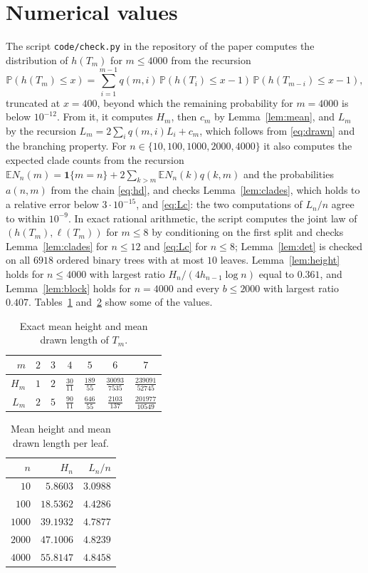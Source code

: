 \documentclass[11pt]{amsart}
\theoremstyle{remark}
\numberwithin{equation}{section}
\newcommand{\E}{\mathbb E}
\newcommand{\Pp}{\mathbb P}
\begin{document}
\section{Numerical values}\label{sec:numerics}

The script \texttt{code/check.py} in the repository of the paper computes the distribution of $h(T_m)$ for $m\le4000$ from the recursion
\[
 \Pp(h(T_m)\le x)=\sum_{i=1}^{m-1}q(m,i)\,\Pp(h(T_i)\le x-1)\,\Pp(h(T_{m-i})\le x-1),
\]
truncated at $x=400$, beyond which the remaining probability for $m=4000$ is below $10^{-12}$. From it, it computes $H_m$, then $c_m$ by Lemma~\ref{lem:mean}, and $L_m$ by the recursion $L_m=2\sum_iq(m,i)L_i+c_m$, which follows from \eqref{eq:drawn} and the branching property. For $n\in\{10,100,1000,2000,4000\}$ it also computes the expected clade counts from the recursion $\E N_n(m)=\mathbf 1\{m=n\}+2\sum_{k>m}\E N_n(k)q(k,m)$ and the probabilities $a(n,m)$ from the chain \eqref{eq:hd}, and checks Lemma~\ref{lem:clades}, which holds to a relative error below $3\cdot10^{-15}$, and \eqref{eq:Lc}: the two computations of $L_n/n$ agree to within $10^{-9}$. In exact rational arithmetic, the script computes the joint law of $(h(T_m),\ell(T_m))$ for $m\le8$ by conditioning on the first split and checks Lemma~\ref{lem:clades} for $n\le12$ and \eqref{eq:Lc} for $n\le8$; Lemma~\ref{lem:det} is checked on all $6918$ ordered binary trees with at most $10$ leaves. Lemma~\ref{lem:height} holds for $n\le4000$ with largest ratio $H_n/(4h_{n-1}\log n)$ equal to $0.361$, and Lemma~\ref{lem:block} holds for $n=4000$ and every $b\le2000$ with largest ratio $0.407$. Tables~\ref{tab:exact} and~\ref{tab:float} show some of the values.

\begin{table}[ht]
\centering
\begin{tabular}{rcccccc}
\toprule
$m$ & $2$ & $3$ & $4$ & $5$ & $6$ & $7$\\
\midrule
$H_m$ & $1$ & $2$ & $\tfrac{30}{11}$ & $\tfrac{189}{55}$ & $\tfrac{30093}{7535}$ & $\tfrac{239091}{52745}$\\[2pt]
$L_m$ & $2$ & $5$ & $\tfrac{90}{11}$ & $\tfrac{646}{55}$ & $\tfrac{2103}{137}$ & $\tfrac{201977}{10549}$\\
\bottomrule
\end{tabular}
\medskip
\caption{Exact mean height and mean drawn length of $T_m$.}\label{tab:exact}
\end{table}

\begin{table}[ht]
\centering
\begin{tabular}{rrr}
\toprule
$n$ & $H_n$ & $L_n/n$\\
\midrule
$10$ & $5.8603$ & $3.0988$\\
$100$ & $18.5362$ & $4.4286$\\
$1000$ & $39.1932$ & $4.7877$\\
$2000$ & $47.1006$ & $4.8239$\\
$4000$ & $55.8147$ & $4.8458$\\
\bottomrule
\end{tabular}
\medskip
\caption{Mean height and mean drawn length per leaf.}\label{tab:float}
\end{table}
\end{document}
